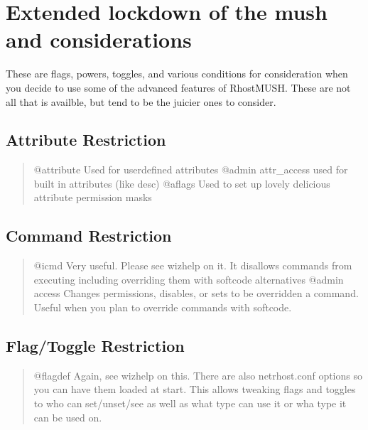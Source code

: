 \documentclass[letterpaper,10pt,english]{sphinxmanual}
\begin{document}
\section{Extended lockdown of the mush and considerations}
\label{\detokenize{security:extended-lockdown-of-the-mush-and-considerations}}
\sphinxAtStartPar
These are flags, powers, toggles, and various conditions for consideration
when you decide to use some of the advanced features of RhostMUSH.
These are not all that is availble, but tend to be the juicier ones to consider.


\subsection{Attribute Restriction}
\label{\detokenize{security:attribute-restriction}}\begin{quote}

\sphinxAtStartPar
@attribute \textendash{} Used for user\sphinxhyphen{}defined attributes
@admin attr\_access \textendash{} used for built in attributes (like desc)
@aflags \textendash{} Used to set up lovely delicious attribute permission masks
\end{quote}


\subsection{Command Restriction}
\label{\detokenize{security:command-restriction}}\begin{quote}

\sphinxAtStartPar
@icmd    \sphinxhyphen{} Very useful.   Please see wizhelp on it.  It disallows commands from executing including overriding them with softcode alternatives
@admin access \sphinxhyphen{} Changes permissions, disables, or sets to be overridden a command.  Useful when you plan to override commands with softcode.
\end{quote}


\subsection{Flag/Toggle Restriction}
\label{\detokenize{security:flag-toggle-restriction}}\begin{quote}

\sphinxAtStartPar
@flagdef \sphinxhyphen{} Again, see wizhelp on this.  There are also netrhost.conf options so you can have them loaded at start.  This allows tweaking flags and toggles to who can set/unset/see as well as what type can use it or wha type it can be used on.
\end{quote}
\end{document}
